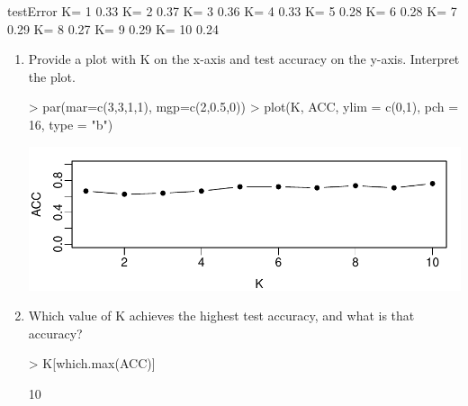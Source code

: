 \documentclass[12pt,a4paper]{paper}
\begin{document}
\begin{enumerate}
\begin{enumerate}
\begin{Schunk}
\begin{Soutput}
      testError
K= 1       0.33
K= 2       0.37
K= 3       0.36
K= 4       0.33
K= 5       0.28
K= 6       0.28
K= 7       0.29
K= 8       0.27
K= 9       0.29
K= 10      0.24
\end{Soutput}
\end{Schunk}
\begin{enumerate}
\item Provide a plot with K on the x-axis and test accuracy on the y-axis. Interpret the plot.
\begin{Schunk}
\begin{Sinput}
> par(mar=c(3,3,1,1), mgp=c(2,0.5,0))
> plot(K, ACC, ylim = c(0,1), pch = 16, type = "b")
\end{Sinput}
\end{Schunk}
\includegraphics{Osorio_Daniel_E2-009}
\item Which value of K achieves the highest test accuracy, and what is that accuracy?
\begin{Schunk}
\begin{Sinput}
> K[which.max(ACC)]
\end{Sinput}
\begin{Soutput}
[1] 10
\end{Soutput}
\end{Schunk}
\end{enumerate}
\end{enumerate}
\end{enumerate}
\end{document}
